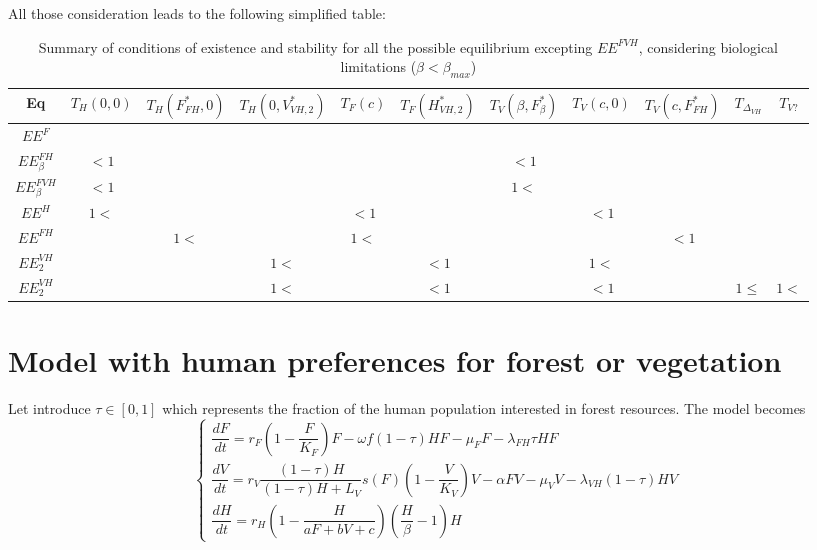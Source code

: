 \documentclass{article}
\begin{document}
All those consideration leads to the following simplified table:
\begin{table}[ht]
\centering
\caption{\centering Summary of conditions of existence and stability for all the possible equilibrium excepting $EE^{FVH}$, considering biological limitations ($\beta < \beta_{max}$)}
{\small
\begin{tabular}{c|c|c|c|c|c|c|c|c|c|c}
Eq & $T_H(0, 0)$ & $T_H(F^*_{FH}, 0)$ & $T_H(0, V^*_{VH,2})$ & $T_F(c)$& $T_F(H^*_{VH, 2})$ & $T_V(\beta, F^*_\beta)$ & $T_V(c, 0)$ & $T_V(c, F^*_{FH})$ & $T_{\Delta_{VH}}$ & $T_{V?}$  \\ \hline
$EE^F$ & & & & & & & & & & \\ \hline
$EE^{FH}_\beta$ & $<1$ & & & & & $<1$ & & & & \\ \hline
$EE^{FVH}_\beta$ & $<1$ & & & & & $1<$ & & & & \\ \hline
$EE^H $ & $1<$  & & & $<1$& & & $<1$ & & & \\ \hline
$EE^{FH} $ & & $1<$  & & $1<$ & & & & $<1$ & & \\ \hline
$EE^{VH}_2 $ & & & $1<$ & & $<1$ & & $1<$ & & & \\ \hline
$EE^{VH}_2 $ & & & $1<$ & & $<1$ & & $<1$ & &$1\leq$& $1<$ \\ \hline
\end{tabular}
}
\end{table}

\newpage

\section{Model with human preferences for forest or vegetation}
Let introduce $\tau \in [0,1]$ which represents the fraction of the human population interested in forest resources. The model becomes
\begin{equation}    
\left\{ \begin{array}{l}
\dfrac{dF}{dt}=r_{F}\left(1-\dfrac{F}{K_{F}}\right)F-\omega f (1-\tau) H F - \mu_F F -\lambda_{FH} \tau H F  \\
\dfrac{dV}{dt}=r_V \dfrac{(1-\tau)H}{(1-\tau)H + L_V} s(F) \left(1-\dfrac{V}{K_{V}}\right)V -\alpha FV-\mu_V V -\lambda_{VH} (1-\tau) H V\\
\dfrac{dH}{dt}=r_H \left(1-\dfrac{H}{aF + bV + c} \right) (\dfrac{H}{\beta} - 1) H
\end{array}\right.
\label{modelPreferences}
\end{equation}

\newpage
\end{document}
